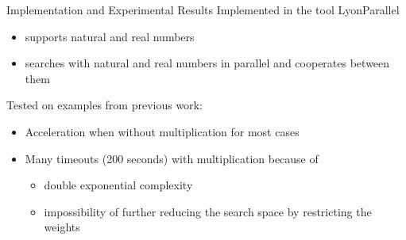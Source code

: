 \documentclass{beamer}
\begin{document}
\begin{frame}{Implementation and Experimental Results}
  \alert{Implemented} in the tool LyonParallel
        \begin{itemize}
          \item supports natural and real numbers
          \item searches with natural and real numbers in parallel and cooperates between them
        \end{itemize}

  \alert{Tested} on examples from previous work:
  \begin{itemize}
    \item \alert{Acceleration} when without multiplication for most cases
    \item Many \alert{timeouts} (200 seconds) with multiplication because of 
         \begin{itemize}
          \item double exponential complexity 
          \item impossibility of further reducing the search space by restricting the weights
         \end{itemize}
  \end{itemize}
\end{frame}
\end{document}
